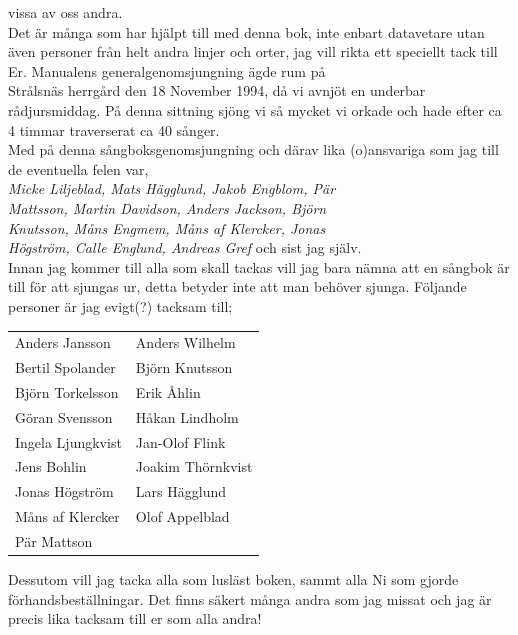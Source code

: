\documentclass[a6paper,fontsize=10pt,twoside,open=right]{scrbook}
\begin{document}
vissa av oss andra.\\ \indent Det är många som har hjälpt till med
denna bok, inte enbart datavetare utan även personer från helt andra
linjer och orter, jag vill rikta ett speciellt tack till Er.
\newpage
\indent Manualens generalgenomsjungning ägde rum på\\ Strålsnäs
herrgård den 18 November 1994, då vi avnjöt en underbar
rådjursmiddag. På denna sittning sjöng vi så mycket vi orkade och hade
efter ca 4 timmar traverserat ca 40 sånger.\\ \indent Med på denna
sångboksgenomsjungning och därav lika (o)ansvariga som jag till de
eventuella felen var,\\ \textit{Micke Liljeblad, Mats Hägglund, Jakob
  Engblom, Pär\\ Mattsson, Martin Davidson, Anders Jackson,
  Björn\\ Knutsson, Måns Engmem, Måns af Klercker, Jonas\\ Högström,
  Calle Englund, Andreas Gref} och sist jag själv.\\ \indent Innan jag
kommer till alla som skall tackas vill jag bara nämna att en sångbok
är till för att sjungas ur, detta betyder inte att man behöver
sjunga. Följande personer är jag evigt(?)  tacksam till;\\

\noindent
\begin{tabular}{@{}p{}p{}@{}}
  Anders Jansson & Anders Wilhelm\\
  Bertil Spolander & Björn Knutsson\\
  Björn Torkelsson & Erik Åhlin\\
  Göran Svensson & Håkan Lindholm\\
  Ingela Ljungkvist & Jan-Olof Flink\\
  Jens Bohlin & Joakim Thörnkvist\\
  Jonas Högström & Lars Hägglund\\
  Måns af Klercker & Olof Appelblad\\
  Pär Mattson
\end{tabular}
\newpage
\indent Dessutom vill jag tacka alla som lusläst boken, sammt alla Ni
som gjorde förhandsbeställningar. Det finns säkert många andra som jag
missat och jag är precis lika tacksam till er som alla
andra!\\
\end{document}

